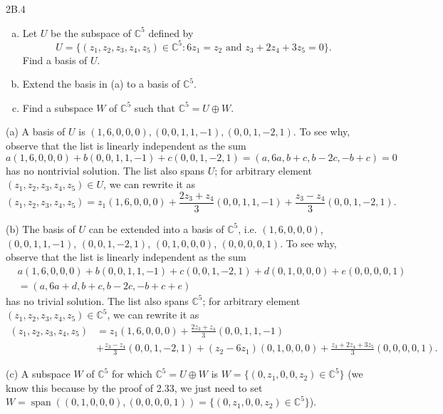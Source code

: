 \documentclass{exam}
\DeclareMathOperator{\spn}{span}
\begin{document}
\begin{problem}{2B.4}
    \begin{enumerate}[(a)]
        \item Let $U$ be the subspace of $\mathbb C^5$ defined by \[
            U = \{(z_1, z_2, z_3, z_4, z_5)\in\mathbb C^5 : 6z_1 = z_2\text{ and }z_3 + 2z_4 + 3z_5 = 0\}.
        \]
        Find a basis of $U$.
        \item Extend the basis in (a) to a basis of $\mathbb C^5$.
        \item Find a subspace $W$ of $\mathbb C^5$ such that $\mathbb C^5 = U\oplus W$.
    \end{enumerate}
\end{problem}

(a) A basis of $U$ is $(1, 6, 0, 0, 0), (0, 0, 1, 1, -1), (0, 0, 1, -2, 1)$. To see why, observe that the list is linearly independent as the sum \[
    a(1, 6, 0, 0, 0) + b(0, 0, 1, 1, -1) + c(0, 0, 1, -2, 1) = (a, 6a, b + c, b - 2c, -b + c) = 0
\]
has no nontrivial solution. The list also spans $U$; for arbitrary element $(z_1, z_2, z_3, z_4, z_5)\in U$, we can rewrite it as \[
    (z_1, z_2, z_3, z_4, z_5) = z_1(1, 6, 0, 0, 0) + \frac{2z_3+z_4}3(0, 0, 1, 1, -1) + \frac{z_3 - z_4}3(0, 0, 1, -2, 1).
\]

(b) The basis of $U$ can be extended into a basis of $\mathbb C^5$, i.e. $(1, 6, 0, 0, 0)$, $(0, 0, 1, 1, -1)$, $(0, 0, 1, -2, 1)$, $(0, 1, 0, 0, 0)$, $(0, 0, 0, 0, 1)$. To see why, observe that the list is linearly independent as the sum \begin{align*}
    &a(1, 6, 0, 0, 0) + b(0, 0, 1, 1, -1) + c(0, 0, 1, -2, 1) + d(0, 1, 0, 0, 0) + e(0, 0, 0, 0, 1)\\
    &= (a, 6a + d, b + c, b - 2c, -b + c + e)
\end{align*}
has no trivial solution. The list also spans $\mathbb C^5$; for arbitrary element $(z_1, z_2, z_3, z_4, z_5)\in\mathbb C^5$, we can rewrite it as
\begin{align*}
    (z_1, z_2, z_3, z_4, z_5) &= z_1(1, 6, 0, 0, 0) + \frac{2z_3 + z_4}3(0, 0, 1, 1, -1)\\
    &+ \frac{z_3 - z_4}3(0, 0, 1, -2, 1) + (z_2 - 6z_1)(0, 1, 0, 0, 0) + \frac{z_3 + 2z_4 + 3z_5}3(0,0,0,0,1).
\end{align*}

(c) A subspace $W$ of $\mathbb C^5$ for which $\mathbb C^5 = U\oplus W$ is $W = \{(0, z_1, 0, 0, z_2)\in\mathbb C^5\}$ (we know this because by the proof of 2.33, we just need to set $W = \spn((0, 1, 0, 0, 0), (0, 0, 0, 0, 1)) = \{(0, z_1, 0, 0, z_2)\in\mathbb C^5\}$).
\end{document}
